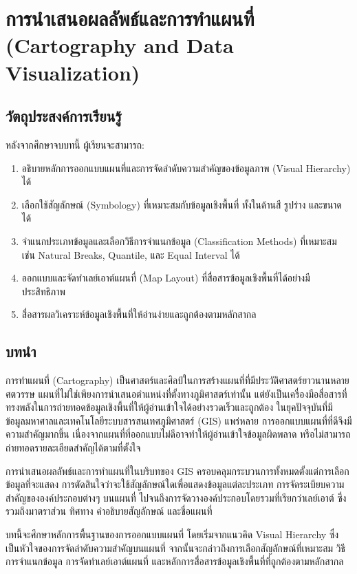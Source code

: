 \chapter{การนำเสนอผลลัพธ์และการทำแผนที่ (Cartography and Data Visualization)}

\section{วัตถุประสงค์การเรียนรู้}
หลังจากศึกษาจบบทนี้ ผู้เรียนจะสามารถ:
\begin{enumerate}
    \item อธิบายหลักการออกแบบแผนที่และการจัดลำดับความสำคัญของข้อมูลภาพ (Visual Hierarchy) ได้
    \item เลือกใช้สัญลักษณ์ (Symbology) ที่เหมาะสมกับข้อมูลเชิงพื้นที่ ทั้งในด้านสี รูปร่าง และขนาด ได้
    \item จำแนกประเภทข้อมูลและเลือกวิธีการจำแนกข้อมูล (Classification Methods) ที่เหมาะสม เช่น Natural Breaks, Quantile, และ Equal Interval ได้
    \item ออกแบบและจัดทำเลย์เอาต์แผนที่ (Map Layout) ที่สื่อสารข้อมูลเชิงพื้นที่ได้อย่างมีประสิทธิภาพ
    \item สื่อสารผลวิเคราะห์ข้อมูลเชิงพื้นที่ให้อ่านง่ายและถูกต้องตามหลักสากล
\end{enumerate}

\section{บทนำ}
การทำแผนที่ (Cartography) เป็นศาสตร์และศิลป์ในการสร้างแผนที่ที่มีประวัติศาสตร์ยาวนานหลายศตวรรษ แผนที่ไม่ใช่เพียงการนำเสนอตำแหน่งที่ตั้งทางภูมิศาสตร์เท่านั้น แต่ยังเป็นเครื่องมือสื่อสารที่ทรงพลังในการถ่ายทอดข้อมูลเชิงพื้นที่ให้ผู้อ่านเข้าใจได้อย่างรวดเร็วและถูกต้อง ในยุคปัจจุบันที่มีข้อมูลมหาศาลและเทคโนโลยีระบบสารสนเทศภูมิศาสตร์ (GIS) แพร่หลาย การออกแบบแผนที่ที่ดีจึงมีความสำคัญมากขึ้น เนื่องจากแผนที่ที่ออกแบบไม่ดีอาจทำให้ผู้อ่านเข้าใจข้อมูลผิดพลาด หรือไม่สามารถถ่ายทอดรายละเอียดสำคัญได้ตามที่ตั้งใจ

การนำเสนอผลลัพธ์และการทำแผนที่ในบริบทของ GIS ครอบคลุมกระบวนการทั้งหมดตั้งแต่การเลือกข้อมูลที่จะแสดง การตัดสินใจว่าจะใช้สัญลักษณ์ใดเพื่อแสดงข้อมูลแต่ละประเภท การจัดระเบียบความสำคัญขององค์ประกอบต่างๆ บนแผนที่ ไปจนถึงการจัดวางองค์ประกอบโดยรวมที่เรียกว่าเลย์เอาต์ ซึ่งรวมถึงมาตราส่วน ทิศทาง คำอธิบายสัญลักษณ์ และชื่อแผนที่

บทนี้จะศึกษาหลักการพื้นฐานของการออกแบบแผนที่ โดยเริ่มจากแนวคิด Visual Hierarchy ซึ่งเป็นหัวใจของการจัดลำดับความสำคัญบนแผนที่ จากนั้นจะกล่าวถึงการเลือกสัญลักษณ์ที่เหมาะสม วิธีการจำแนกข้อมูล การจัดทำเลย์เอาต์แผนที่ และหลักการสื่อสารข้อมูลเชิงพื้นที่ที่ถูกต้องตามหลักสากล

